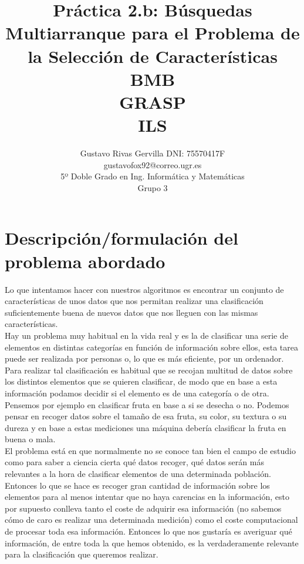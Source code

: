 \documentclass[10pt,a4paper]{article}
\author{Gustavo Rivas Gervilla DNI: 75570417F \\ gustavofox92@correo.ugr.es \\5º Doble Grado en Ing. Informática y Matemáticas \\Grupo 3}
\title{Práctica 2.b: Búsquedas Multiarranque para el Problema de la Selección de Características \\ BMB \\ GRASP \\ ILS}
\date{}
\begin{document}
\lstset{language=Python, style=customPy}
\maketitle

\newpage

\tableofcontents

\newpage

\section{\color[rgb]{0.0,0.0,0.21}Descripción/formulación del problema abordado}
Lo que intentamos hacer con nuestros algoritmos es encontrar un conjunto de características de unos datos que nos permitan realizar una clasificación suficientemente buena de nuevos datos que nos lleguen con las mismas características.\\

Hay un problema muy habitual en la vida real y es la de clasificar una serie de elementos en distintas categorías en función de información sobre ellos, esta tarea puede ser realizada por personas o, lo que es más eficiente, por un ordenador. Para realizar tal clasificación es habitual que se recojan multitud de datos sobre los distintos elementos que se quieren clasificar, de modo que en base a esta información podamos decidir si el elemento es de una categoría o de otra. Pensemos por ejemplo en clasificar fruta en base a si se desecha o no. Podemos pensar en recoger datos sobre el tamaño de esa fruta, su color, su textura o su dureza y en base a estas mediciones una máquina debería clasificar la fruta en buena o mala.\\

El problema está en que normalmente no se conoce tan bien el campo de estudio como para saber a ciencia cierta qué datos recoger, qué datos serán más relevantes a la hora de clasificar elementos de una determinada población. Entonces lo que se hace es recoger gran cantidad de información sobre los elementos para al menos intentar que no haya carencias en la información, esto por supuesto conlleva tanto el coste de adquirir esa información (no sabemos cómo de caro es realizar una determinada medición) como el coste computacional de procesar toda esa información. Entonces lo que nos gustaría es averiguar qué información, de entre toda la que hemos obtenido, es la verdaderamente relevante para la clasificación que queremos realizar.\\
\end{document}
